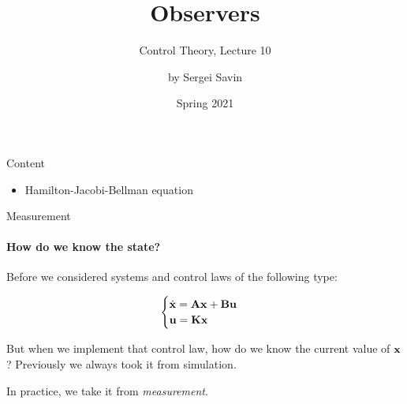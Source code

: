 \documentclass{beamer}
\title{Observers}
\subtitle{Control Theory, Lecture 10}
\author{by Sergei Savin}
\date{Spring 2021}
\begin{document}
\maketitle


\begin{frame}{Content}
\begin{itemize}
\item Hamilton-Jacobi-Bellman equation
\end{itemize}
\end{frame}




\begin{frame}{Measurement}
\framesubtitle{How do we know the state?}
\begin{flushleft}

Before we considered systems and control laws of the following type:

\begin{equation}
\begin{cases}
\dot {\mathbf{x}} = \mathbf{A} \mathbf{x} + \mathbf{B} \mathbf{u}\\
\mathbf{u} = \mathbf K \mathbf{x}
\end{cases}
\end{equation}

But when we implement that control law, how do we know the current value of $\mathbf{x}$? Previously we always took it from simulation. 

\bigskip

In practice, we take it from \emph{measurement}.

\end{flushleft}
\end{frame}
\end{document}
